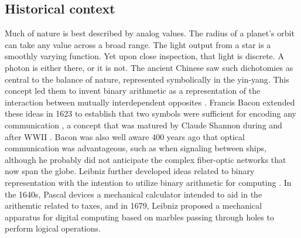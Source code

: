 \documentclass[twocolumn]{article}
\begin{document}
\subsection{\label{sec:history}Historical context}
Much of nature is best described by analog values. The radius of a planet's orbit can take any value across a broad range. The light output from a star is a smoothly varying function. Yet upon close inspection, that light is discrete. A photon is either there, or it is not. The ancient Chinese saw such dichotomies as central to the balance of nature, represented symbolically in the yin-yang. This concept led them to invent binary arithmetic as a representation of the interaction between mutually interdependent opposites \cite{http://www.atimes.com/leibniz-chinese-invented-first-binary-code/}. Francis Bacon extended these ideas in 1623 to establish that two symbols were sufficient for encoding any communication \cite{dy2012}, a concept that was matured by Claude Shannon during and after WWII \cite{sh1948}. Bacon was also well aware 400 years ago that optical communication was advantageous, such as when signaling between ships, although he probably did not anticipate the complex fiber-optic networks that now span the globe. Leibniz further developed ideas related to binary representation \cite{http://www.leibniz-translations.com/binary.htm} with the intention to utilize binary arithmetic for computing \cite{https://hal.archives-ouvertes.fr/ads-00104781/document,dy2012}. In the 1640s, Pascal devices a mechanical calculator intended to aid in the arithemtic related to taxes, and in 1679, Leibniz proposed a mechanical apparatus for digital computing based on marbles passing through holes to perform logical operations.
\end{document}

